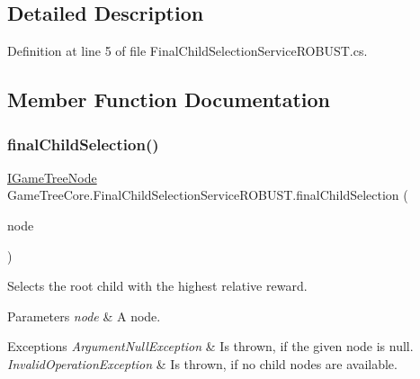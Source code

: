 \subsection{Detailed Description}


Definition at line 5 of file Final\+Child\+Selection\+Service\+R\+O\+B\+U\+S\+T.\+cs.



\subsection{Member Function Documentation}
\mbox{\label{class_game_tree_core_1_1_final_child_selection_service_r_o_b_u_s_t_a8863618ea3c7a12f1dee3774ab62888e}} 
\subsubsection{\texorpdfstring{final\+Child\+Selection()}{finalChildSelection()}}
{\footnotesize\ttfamily \mbox{\hyperlink{interface_game_tree_core_1_1_i_game_tree_node}{I\+Game\+Tree\+Node}} Game\+Tree\+Core.\+Final\+Child\+Selection\+Service\+R\+O\+B\+U\+S\+T.\+final\+Child\+Selection (\begin{DoxyParamCaption}\item[{\mbox{\hyperlink{interface_game_tree_core_1_1_i_game_tree_node}{I\+Game\+Tree\+Node}}}]{node }\end{DoxyParamCaption})}



Selects the root child with the highest relative reward. 


\begin{DoxyParams}{Parameters}
{\em node} & A node.\\
\hline
\end{DoxyParams}

\begin{DoxyExceptions}{Exceptions}
{\em Argument\+Null\+Exception} & Is thrown, if the given node is null.\\
\hline
{\em Invalid\+Operation\+Exception} & Is thrown, if no child nodes are available.\\
\hline
\end{DoxyExceptions}


